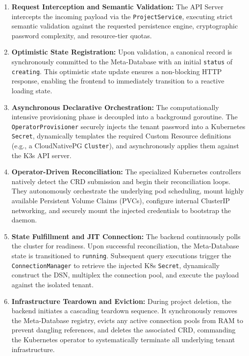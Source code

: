 \begin{enumerate}
    \item \textbf{Request Interception and Semantic Validation:} The API Server intercepts the incoming payload via the \texttt{ProjectService}, executing strict semantic validation against the requested persistence engine, cryptographic password complexity, and resource-tier quotas.
    \item \textbf{Optimistic State Registration:} Upon validation, a canonical record is synchronously committed to the Meta-Database with an initial \texttt{status} of \texttt{creating}. This optimistic state update ensures a non-blocking HTTP response, enabling the frontend to immediately transition to a reactive loading state.
    \item \textbf{Asynchronous Declarative Orchestration:} The computationally intensive provisioning phase is decoupled into a background goroutine. The \texttt{OperatorProvisioner} securely injects the tenant password into a Kubernetes \texttt{Secret}, dynamically templates the required Custom Resource definitions (e.g., a CloudNativePG \texttt{Cluster}), and asynchronously applies them against the K3s API server.
    \item \textbf{Operator-Driven Reconciliation:} The specialized Kubernetes controllers natively detect the CRD submission and begin their reconciliation loops. They autonomously orchestrate the underlying pod scheduling, mount highly available Persistent Volume Claims (PVCs), configure internal ClusterIP networking, and securely mount the injected credentials to bootstrap the daemon.
    \item \textbf{State Fulfillment and JIT Connection:} The backend continuously polls the cluster for readiness. Upon successful reconciliation, the Meta-Database state is transitioned to \texttt{running}. Subsequent query executions trigger the \texttt{ConnectionManager} to retrieve the injected K8s \texttt{Secret}, dynamically construct the DSN, multiplex the connection pool, and execute the payload against the isolated tenant.
    \item \textbf{Infrastructure Teardown and Eviction:} During project deletion, the backend initiates a cascading teardown sequence. It synchronously removes the Meta-Database registry, evicts any active connection pools from RAM to prevent dangling references, and deletes the associated CRD, commanding the Kubernetes operator to systematically terminate all underlying tenant infrastructure.
\end{enumerate}

